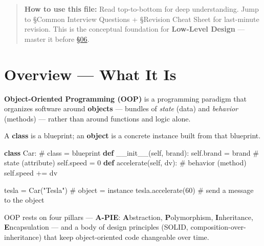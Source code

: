 \documentclass[11pt]{article}
\newenvironment{Shaded}{\begin{snugshade}}{\end{snugshade}}
\newcommand{\CommentTok}[1]{\textcolor[rgb]{0.48,0.49,0.49}{#1}}
\newcommand{\DecValTok}[1]{\textcolor[rgb]{0.96,0.45,0.00}{#1}}
\newcommand{\FunctionTok}[1]{\textcolor[rgb]{0.56,0.27,0.68}{#1}}
\newcommand{\KeywordTok}[1]{\textcolor[rgb]{0.81,0.81,0.76}{\textbf{#1}}}
\newcommand{\NormalTok}[1]{\textcolor[rgb]{0.81,0.81,0.76}{#1}}
\newcommand{\OperatorTok}[1]{\textcolor[rgb]{0.81,0.81,0.76}{#1}}
\newcommand{\StringTok}[1]{\textcolor[rgb]{0.96,0.31,0.31}{#1}}
\newcommand{\VariableTok}[1]{\textcolor[rgb]{0.15,0.68,0.68}{#1}}
\begin{document}
\makecoverpage

\thispagestyle{empty}
{\hypersetup{hidelinks}\tableofcontents}
\clearpage

\begin{quote}
\textbf{How to use this file:} Read top-to-bottom for deep understanding. Jump to §Common Interview Questions + §Revision Cheat Sheet for last-minute revision. This is the conceptual foundation for \textbf{Low-Level Design} --- master it before \hyperlink{section.06}{\textcolor{acc}{§06}}.
\end{quote}

\section{Overview --- What It Is}\label{overview--what-it-is}

\textbf{Object-Oriented Programming (OOP)} is a programming paradigm that organizes software around \textbf{objects} --- bundles of \emph{state} (data) and \emph{behavior} (methods) --- rather than around functions and logic alone.

A \textbf{class} is a blueprint; an \textbf{object} is a concrete instance built from that blueprint.


\begin{Shaded}
\begin{Highlighting}[]
\KeywordTok{class}\NormalTok{ Car:                       }\CommentTok{\# class = blueprint}
    \KeywordTok{def} \FunctionTok{\_\_init\_\_}\NormalTok{(}\VariableTok{self}\NormalTok{, brand):}
        \VariableTok{self}\NormalTok{.brand }\OperatorTok{=}\NormalTok{ brand       }\CommentTok{\# state (attribute)}
        \VariableTok{self}\NormalTok{.speed }\OperatorTok{=} \DecValTok{0}
    \KeywordTok{def}\NormalTok{ accelerate(}\VariableTok{self}\NormalTok{, dv):    }\CommentTok{\# behavior (method)}
        \VariableTok{self}\NormalTok{.speed }\OperatorTok{+=}\NormalTok{ dv}

\NormalTok{tesla }\OperatorTok{=}\NormalTok{ Car(}\StringTok{"Tesla"}\NormalTok{)             }\CommentTok{\# object = instance}
\NormalTok{tesla.accelerate(}\DecValTok{60}\NormalTok{)             }\CommentTok{\# send a message to the object}
\end{Highlighting}
\end{Shaded}

OOP rests on four pillars --- \textbf{A-PIE}: \textbf{A}bstraction, \textbf{P}olymorphism, \textbf{I}nheritance, \textbf{E}ncapsulation --- and a body of design principles (SOLID, composition-over-inheritance) that keep object-oriented code changeable over time.
\end{document}
